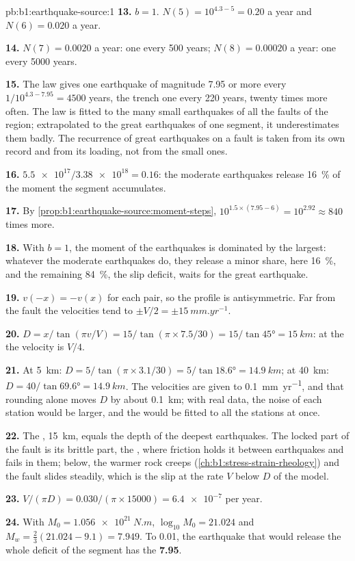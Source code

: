 \begin{solution}{pb:b1:earthquake-source:1}
\textbf{13.} $b = 1$. $N(5) = 10^{4.3 - 5} = 0.20$ a year and $N(6) = 0.020$ a
year.

\textbf{14.} $N(7) = 0.0020$ a year: one every 500 years; $N(8) = 0.00020$ a
year: one every \num{5000} years.

\textbf{15.} The law gives one earthquake of magnitude 7.95 or more every
$1/10^{4.3 - 7.95} = \num{4500}$ years, the trench one every 220 years, twenty
times more often. The law is fitted to the many small earthquakes of all the
faults of the region; extrapolated to the great earthquakes of one segment, it
underestimates them badly. The recurrence of great earthquakes on a fault is
taken from its own record and from its loading, not from the small ones.

\textbf{16.} $\num{5.5e17}/\num{3.38e18} = 0.16$: the moderate earthquakes
release \qty{16}{\percent} of the moment the segment accumulates.

\textbf{17.} By \cref{prop:b1:earthquake-source:moment-steps},
$10^{1.5\times(7.95 - 6)} = 10^{2.92} \approx 840$ times more.

\textbf{18.} With $b = 1$, the moment of the earthquakes is dominated by the
largest: whatever the moderate earthquakes do, they release a minor share, here
\qty{16}{\percent}, and the remaining \qty{84}{\percent}, the slip deficit,
waits for the great earthquake.

\textbf{19.} $v(-x) = -v(x)$ for each pair, so the profile is antisymmetric.
Far from the fault the velocities tend to $\pm V/2 = \pm\qty{15}{mm.yr^{-1}}$.

\textbf{20.} $D = x/\tan(\pi v/V) = 15/\tan(\pi\times7.5/30) = 15/\tan\ang{45} =
\qty{15}{km}$: at the  the velocity is $V/4$.

\textbf{21.} At \qty{5}{km}: $D = 5/\tan(\pi\times3.1/30) = 5/\tan\ang{18.6} =
\qty{14.9}{km}$; at \qty{40}{km}: $D = 40/\tan\ang{69.6} = \qty{14.9}{km}$. The
velocities are given to \qty{0.1}{mm.yr^{-1}}, and that rounding alone moves
$D$ by about \qty{0.1}{km}; with real data, the noise of each station would be
larger, and the  would be fitted to all the stations at once.

\textbf{22.} The , \qty{15}{km}, equals the depth of the deepest
earthquakes. The locked part of the fault is its brittle part, the , where friction holds it between earthquakes and fails in them; below, the
warmer rock creeps (\cref{ch:b1:stress-strain-rheology}) and the fault slides
steadily, which is the slip at the rate $V$ below $D$ of the model.

\textbf{23.} $V/(\pi D) = \num{0.030}/(\pi\times\num{15000}) = \num{6.4e-7}$
per year.

\textbf{24.} With $M_0 = \qty{1.056e21}{N.m}$, $\log_{10}M_0 = 21.024$ and
$M_w = \tfrac23(21.024 - 9.1) = 7.949$. To 0.01, the earthquake that would
release the whole deficit of the segment has the 
\textbf{7.95}.
\end{solution}
